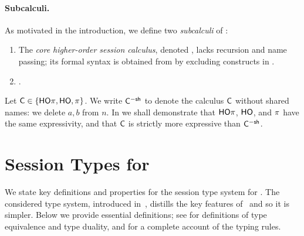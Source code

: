 \documentclass[runningheads]{llncs}
\begin{document}
{

\paragraph{Subcalculi.}
As motivated in the introduction, 
we define two \emph{subcalculi} of \HOp: 
\begin{enumerate}[$\bullet$]
	\item	The  
		{\em core higher-order session calculus}, denoted \HO,
		 lacks recursion and name passing; its 
		formal syntax is obtained from  by excluding 
		constructs in .

	\item	{}.

\end{enumerate}
%
Let $\mathsf{C} \in \{\mathsf{HO}\pi, \mathsf{HO}, \pi\}$. We write 
$\mathsf{C}^{-\mathsf{sh}}$ to denote the calculus $\mathsf{C}$ without shared names:
we delete $a,b$ from $n$. 
In 
we shall demonstrate that 
$\mathsf{HO}\pi$, $\mathsf{HO}$, and $\pi$ have the same expressivity,
and that $\mathsf{C}$ is strictly more expressive than $\mathsf{C}^{-\mathsf{sh}}$.



\section{Session Types for \HOp}
\label{sec:types}

We state key definitions and properties for the session type system for \HOp.
The considered type system,
introduced in~\cite{KouzapasPY17},
 distills the key features of~\cite{tlca07,MostrousY15} and so it is simpler.
 Below we provide essential definitions; see  for definitions of type equivalence and type duality, and 
for a complete account of the typing rules.


}
\end{document}
